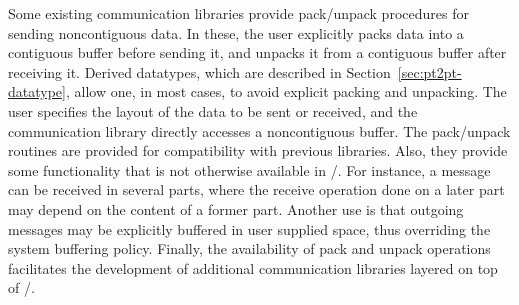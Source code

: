 Some existing communication libraries provide pack/unpack procedures for sending
noncontiguous data. In these, the user explicitly packs
data into a contiguous buffer
before sending it, and unpacks it from a contiguous buffer after receiving it.
Derived datatypes, which are described in
Section~\ref{sec:pt2pt-datatype}, allow one, in most cases, to avoid
explicit packing and unpacking.  The user specifies the layout of
the data to be sent or received, and the communication library directly
accesses a noncontiguous buffer.  The pack/unpack routines are provided for
compatibility with previous libraries.   Also, they provide some functionality
that is not otherwise available in \MPI/.
For instance, a message can be received in several
parts, where the receive operation done on
a later part may depend on the content of a former part.
Another use is that outgoing messages
may be explicitly buffered in user supplied space, thus overriding the system
buffering policy.   Finally, the availability of pack and unpack operations
facilitates the development of additional communication libraries layered on top
of \MPI/.

